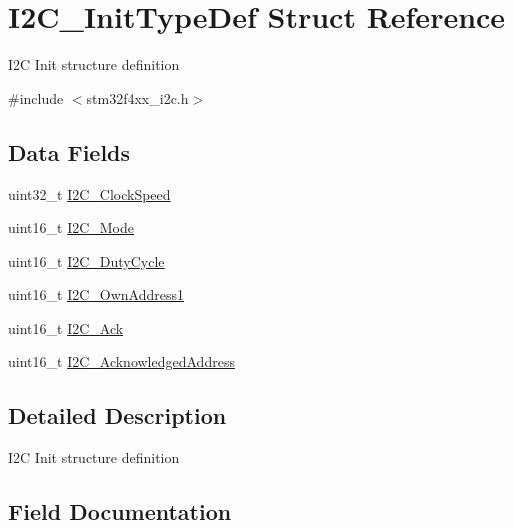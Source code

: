 \hypertarget{struct_i2_c___init_type_def}{}\section{I2\+C\+\_\+\+Init\+Type\+Def Struct Reference}
\label{struct_i2_c___init_type_def}


I2C Init structure definition ~\newline
  




{\ttfamily \#include $<$stm32f4xx\+\_\+i2c.\+h$>$}

\subsection*{Data Fields}
\begin{DoxyCompactItemize}
\item 
uint32\+\_\+t \mbox{\hyperlink{struct_i2_c___init_type_def_af8d72d15cd29b7e69591ce3edab497f6}{I2\+C\+\_\+\+Clock\+Speed}}
\item 
uint16\+\_\+t \mbox{\hyperlink{struct_i2_c___init_type_def_a165269b65702e348e32ccd8029e65af1}{I2\+C\+\_\+\+Mode}}
\item 
uint16\+\_\+t \mbox{\hyperlink{struct_i2_c___init_type_def_a349afc2bb8534c072349a6061f29344a}{I2\+C\+\_\+\+Duty\+Cycle}}
\item 
uint16\+\_\+t \mbox{\hyperlink{struct_i2_c___init_type_def_ae62dca9cea4fdb3eb8f9554b5f35fe4f}{I2\+C\+\_\+\+Own\+Address1}}
\item 
uint16\+\_\+t \mbox{\hyperlink{struct_i2_c___init_type_def_ab21d61d68d06e97d7c0ab90c8e396464}{I2\+C\+\_\+\+Ack}}
\item 
uint16\+\_\+t \mbox{\hyperlink{struct_i2_c___init_type_def_af46be2bc866a7dbf0d529dd770b105b3}{I2\+C\+\_\+\+Acknowledged\+Address}}
\end{DoxyCompactItemize}


\subsection{Detailed Description}
I2C Init structure definition ~\newline
 

\subsection{Field Documentation}
\mbox{\label{struct_i2_c___init_type_def_ab21d61d68d06e97d7c0ab90c8e396464}} 
